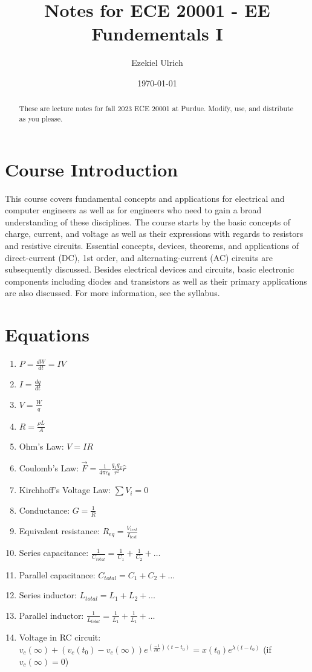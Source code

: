 \documentclass[nobib]{tufte-handout}
\title{Notes for ECE 20001 - EE Fundementals I}
\author[Ezekiel Ulrich]{Ezekiel Ulrich}
\date{\today}  %
\begin{document}
\maketitle

\begin{abstract}
These are lecture notes for fall 2023 ECE 20001 at Purdue. Modify, use, and distribute as you please.
\end{abstract}

\tableofcontents

\section{Course Introduction}

This course covers fundamental concepts and applications 
for electrical and computer engineers as well as for engineers
 who need to gain a broad understanding of these disciplines. 
 The course starts by the basic concepts of charge, current, 
 and voltage as well as their expressions with regards to 
 resistors and resistive circuits. Essential concepts, 
 devices, theorems, and applications of direct-current (DC), 
 1st order, and alternating-current (AC) circuits are 
 subsequently discussed. Besides electrical devices and 
 circuits, basic electronic components including diodes and 
 transistors as well as their primary applications are also 
 discussed. For more information, see the syllabus. 

\section{Equations}

\begin{enumerate}
    \item $P = \frac{dW}{dt} = IV$
    \item $I = \frac{dq}{dt}$
    \item $V = \frac{W}{q}$
    \item $R = \frac{\rho L}{A}$
    \item Ohm's Law: $V=IR$
    \item Coulomb's Law: $\vec{F} = \frac{1}{4\pi \epsilon_0}\frac{q_1 q_2}{r^2}\hat{r}$
    \item Kirchhoff's Voltage Law: $\sum V_i = 0$
    \item Conductance: $G = \frac{1}{R}$
    \item Equivalent resistance: $R_{eq} = \frac{V_{test}}{I_{test}}$
    \item Series capacitance: $\frac{1}{C_{total}} = \frac{1}{C_1} + \frac{1}{C_2} + \dots$
    \item Parallel capacitance: $C_{total} = C_1 + C_2 + \dots$
    \item Series inductor: $L_{total} = L_1+L_2+\dots$
    \item Parallel inductor: $\frac{1}{L_{total}} = \frac{1}{L_1} + \frac{1}{L_1} + \dots$
    \item Voltage in RC circuit: 
    $v_c(\infty) +\left(v_c(t_0) - v_c(\infty)\right)e^{(\frac{-1}{RC})(t - t_0)} = x(t_0)e^{\lambda (t-t_0)}$
    (if $v_c(\infty) = 0$)
\end{enumerate}
\end{document}
